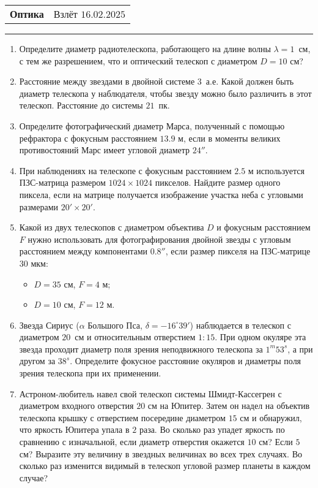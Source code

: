 \documentclass[12pt]{article}
\begin{document}
\begin{tabularx}{\textwidth}{Xr}
{\Large \textbf{Оптика}} & Взлёт $16.02.2025$ \\
\end{tabularx}
\noindent\rule{\textwidth}{0.4pt}
\begin{enumerate}
    \item Определите диаметр   радиотелескопа, работающего на длине волны $\lambda=1$~см, с тем же разрешением, что и оптический телескоп с диаметром $D=10$ см?
    \item Расстояние между звездами в двойной системе $3$~а.е. Какой должен быть диаметр телескопа у наблюдателя, чтобы звезду можно было различить в этот телескоп. Расстояние до системы $21$~пк.
    \item Определите фотографический диаметр Марса, полученный с помощью рефрактора с фокусным расстоянием $13.9$ м, если в моменты великих противостояний Марс имеет угловой диаметр $24''$.
    \item При наблюдениях на телескопе с фокусным расстоянием $2.5$ м используется ПЗС-матрица размером $1024 \times 1024$ пикселов. Найдите размер одного пиксела, если на матрице получается изображение участка неба с угловыми размерами $20' \times 20'$. 
    \item Какой из двух телескопов с диаметром объектива $D$ и фокусным расстоянием $F$ нужно использовать для фотографирования двойной звезды с угловым расстоянием между компонентами $0.8''$, если размер пикселя на ПЗС-матрице $30$ мкм:
	\begin{itemize}
		\item $D = 35$ см, $F = 4$ м;
		\item $D = 10$ см, $F = 12$ м.
	\end{itemize}
    \item Звезда Сириус ($\alpha$ Большого Пса, $\delta=-16^{\circ}39'$) наблюдается в телескоп с диаметром $20$~см и относительным отверстием $1:15$. При одном окуляре эта звезда проходит диаметр поля зрения неподвижного телескопа за $1^m53^s$, а при другом за $38^s$. Определите фокусное расстояние окуляров и диаметры поля зрения телескопа при их применении.
    \item Астроном-любитель навел свой телескоп системы Шмидт-Кассегрен с диаметром входного отверстия $20$ см на Юпитер. Затем он надел на объектив телескопа крышку с отверстием посередине диаметром $15$ см и обнаружил, что яркость Юпитера упала в $2$ раза. Во сколько раз упадет яркость по сравнению с изначальной, если диаметр отверстия окажется $10$ см? Если $5$ см? Выразите эту величину в звездных величинах во всех трех случаях. Во сколько раз изменится видимый в телескоп угловой размер планеты в каждом случае?

\end{enumerate}
\end{document}
